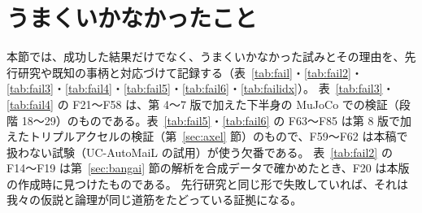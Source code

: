 \documentclass[paper=a4paper,fontsize=10pt,twocolumn,column_gap=2zw,line_length=24zw,number_of_lines=46,head_space=20mm]{jlreq}
\begin{document}
\section{うまくいかなかったこと}\label{sec:fail}

本節では、成功した結果だけでなく、うまくいかなかった試みとその理由を、先行研究や既知の事柄と対応づけて記録する（表~\ref{tab:fail}・\ref{tab:fail2}・\ref{tab:fail3}・\ref{tab:fail4}・\ref{tab:fail5}・\ref{tab:fail6}・\ref{tab:failidx}）。
表~\ref{tab:fail3}・\ref{tab:fail4} の F21〜F58 は、第 4〜7 版で加えた下半身の MuJoCo での検証（段階 18〜29）のものである。表~\ref{tab:fail5}・\ref{tab:fail6} の F63〜F85 は第 8 版で加えたトリプルアクセルの検証（第~\ref{sec:axel} 節）のもので、F59〜F62 は本稿で扱わない試験（UC-AutoMaiL の試用）が使う欠番である。
表~\ref{tab:fail2} の F14〜F19 は第~\ref{sec:bangai} 節の解析を合成データで確かめたとき、F20 は本版の作成時に見つけたものである。
先行研究と同じ形で失敗していれば、それは我々の仮説と論理が同じ道筋をたどっている証拠になる。
\end{document}
